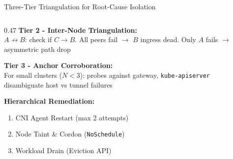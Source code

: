 \documentclass[aspectratio=169, 11pt]{beamer}
\begin{document}
\begin{frame}{Three-Tier Triangulation for Root-Cause Isolation}
\begin{columns}[T]
\begin{column}{0.47\textwidth}
\vspace{3pt}
\textbf{Tier 2 - Inter-Node Triangulation:}\\
$A \not\to B$: check if $C \to B$. All peers fail $\to$ $B$ ingress dead. Only $A$ fails $\to$ asymmetric path drop

\vspace{3pt}
\textbf{Tier 3 - Anchor Corroboration:}\\
For small clusters ($N < 3$): probes against gateway, \texttt{kube-apiserver} disambiguate host vs tunnel failures

\vspace{4pt}
\textbf{Hierarchical Remediation:}
\begin{enumerate}
  \item CNI Agent Restart (max 2 attempts)
  \item Node Taint \& Cordon (\texttt{NoSchedule})
  \item Workload Drain (Eviction API)
\end{enumerate}
\end{column}
\end{columns}

\end{frame}
\end{document}
